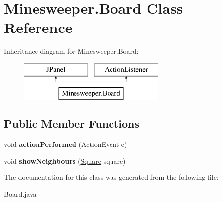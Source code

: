 \hypertarget{class_minesweeper_1_1_board}{}\section{Minesweeper.\+Board Class Reference}
\label{class_minesweeper_1_1_board}
Inheritance diagram for Minesweeper.\+Board\+:\begin{figure}[H]
\begin{center}
\leavevmode
\includegraphics[height=2.000000cm]{class_minesweeper_1_1_board}
\end{center}
\end{figure}
\subsection*{Public Member Functions}
\begin{DoxyCompactItemize}
\item 
\mbox{\label{class_minesweeper_1_1_board_a8a7b7d6303073fc6159a97bdf3ec9d91}} 
void {\bfseries action\+Performed} (Action\+Event e)
\item 
\mbox{\label{class_minesweeper_1_1_board_a44bb669c97a620f57b226561374984e1}} 
void {\bfseries show\+Neighbours} (\hyperlink{class_minesweeper_1_1_square}{Square} square)
\end{DoxyCompactItemize}


The documentation for this class was generated from the following file\+:\begin{DoxyCompactItemize}
\item 
Board.\+java\end{DoxyCompactItemize}
